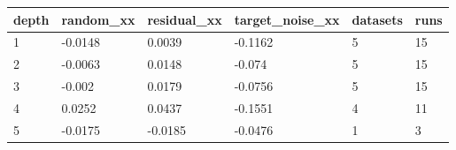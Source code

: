 \begin{tabular}{llllll}
\toprule
depth & random\_xx & residual\_xx & target\_noise\_xx & datasets & runs \\
\midrule
1 & -0.0148 & 0.0039 & -0.1162 & 5 & 15 \\
2 & -0.0063 & 0.0148 & -0.074 & 5 & 15 \\
3 & -0.002 & 0.0179 & -0.0756 & 5 & 15 \\
4 & 0.0252 & 0.0437 & -0.1551 & 4 & 11 \\
5 & -0.0175 & -0.0185 & -0.0476 & 1 & 3 \\
\bottomrule
\end{tabular}
